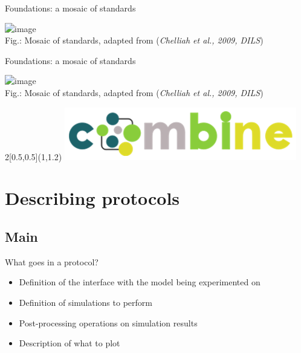 \documentclass[t,xcolor={usenames,dvipsnames}]{beamer}
\begin{document}
\begin{frame}{Foundations: a mosaic of standards}
\begin{center}
\includegraphics<1->[scale=.5]{standards_mosaic}\\
{\tiny Fig.: Mosaic of standards, adapted from (\textit{Chelliah et al., 2009, DILS})}
\end{center}
\end{frame}

\begin{frame}{Foundations: a mosaic of standards}
\begin{center}
\includegraphics<1->[scale=.5]{standards_mosaic}\\
{\tiny Fig.: Mosaic of standards, adapted from (\textit{Chelliah et al., 2009, DILS})}
\end{center}
\begin{textblock}{2}[0.5,0.5](1,1.2)
\centering
\includegraphics[scale=.8]{COMBINE}
\end{textblock}
\end{frame}


\section{Describing protocols}
\subsection*{Main}

\begin{frame}{What goes in a protocol?}
\begin{itemize}
\item Definition of the interface with the model being experimented on
\item Definition of simulations to perform
\item Post-processing operations on simulation results
\item Description of what to plot
\end{itemize}
\end{frame}
\end{document}
